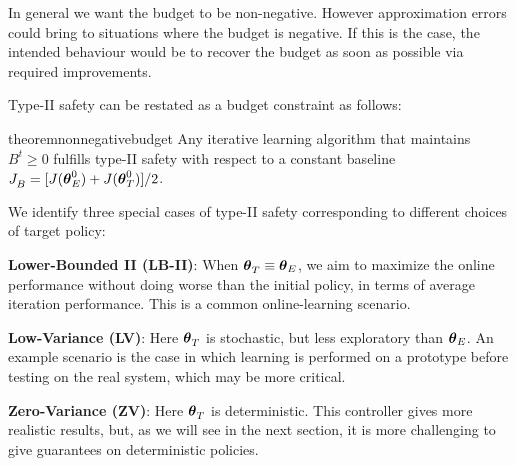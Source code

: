 \begin{note}
In general we want the budget to be non-negative. However approximation errors could bring to situations where the budget is negative. If this is the case, the intended behaviour would be to recover the budget as soon as possible via required improvements.
\end{note}

Type-II safety can be restated as a budget constraint as follows:
\begin{restatable}{theorem}{nonnegativebudget}\label{th:nonnegativebudget}
Any iterative learning algorithm that maintains $B^t \geq 0$ fulfills type-II safety with respect to a constant baseline $\jbase[] = [J(\vtheta_E^0) + J(\vtarget[0])] / 2$.
\end{restatable}
%
We identify three special cases of type-II safety corresponding to different choices of target policy:

\textbf{Lower-Bounded II (LB-II)}: When $\vtarget[] \equiv \vtheta_E$, we aim to maximize the online performance without doing worse than the initial policy, in terms of average iteration performance. This is a common online-learning scenario.

\textbf{Low-Variance (LV)}:  Here $\vtarget[]$ is stochastic, but less exploratory than $\vtheta_E$. An example scenario is the case in which learning is performed on a prototype before testing on the real system, which may be more critical. 

\textbf{Zero-Variance (ZV)}: Here $\vtarget[]$ is deterministic. This controller gives more realistic results, but, as we will see in the next section, it is more challenging to give guarantees on deterministic policies.  

